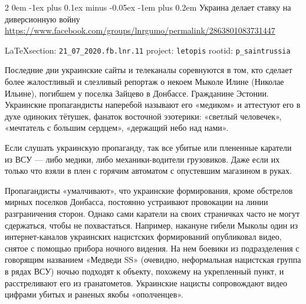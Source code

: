 \documentclass[a4paper,11pt]{extreport}
\makeatletter
\renewcommand\subsection{%
  \clearpage
    \@startsection{subsection}%
    {2}%
    {0em}%
    {-1ex plus 0.1ex minus -0.05ex}%
    {-1em plus 0.2em}%
    {\scshape\bfseries\Large}%
}
\makeatother
\begin{document}
 

\subsection{Украина делает ставку на диверсионную войну}
\label{sec:21_07_2020.fb.lnr.11}
\url{https://www.facebook.com/groups/lnrgumo/permalink/2863801083731447}
  
\vspace{0.5cm}
{\small\LaTeX section: \verb|21_07_2020.fb.lnr.11| project: \verb|letopis| rootid: \verb|p_saintrussia|}
\vspace{0.5cm}



Последние дни украинские сайты и телеканалы соревнуются в том, кто сделает
более жалостливый и слезливый репортаж о некоем Мыколе Илине (Николае Ильине),
погибшем у поселка Зайцево в Донбассе. Гражданине Эстонии. Украинские
пропагандисты наперебой называют его «медиком» и аттестуют его в духе одиноких
тётушек, фанаток восточной эзотерики: «светлый человечек», «мечтатель с большим
сердцем», «держащий небо над нами».

Если слушать украинскую пропаганду, так все убитые или плененные каратели из
ВСУ --- либо медики, либо механики-водители грузовиков. Даже если их только что
взяли в плен с горячим автоматом с опустевшим магазином в руках.

Пропагандисты «умалчивают», что украинские формирования, кроме обстрелов мирных
поселков Донбасса, постоянно устраивают провокации на линии разграничения
сторон. Однако сами каратели на своих страничках часто не могут сдержаться,
чтобы не похвастаться. Например, накануне гибели Мыколы один из
интернет-каналов украинских нацистских формирований опубликовал видео, снятое с
помощью прибора ночного видения. На нем боевики из подразделения с говорящим
названием «Медведи SS» (очевидно, неформальная нацистская группа в рядах ВСУ)
ночью подходят к объекту, похожему на укрепленный пункт, и расстреливают его из
гранатометов. Украинские нацисты сопровождают видео цифрами убитых и раненых
якобы «ополченцев».
\end{document}
